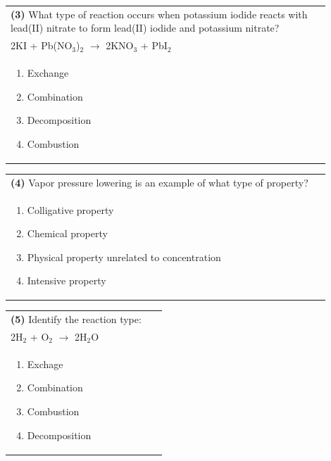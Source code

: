 \documentclass{article}
\begin{document}
\noindent\begin{tabular}{|p{0.9\linewidth}|}
\hline
\textbf{(3)} What type of reaction occurs when potassium iodide reacts with lead(II) nitrate to form lead(II) iodide and potassium nitrate?\\[0.2cm]
2KI + Pb(NO$_3$)$_2$ $\rightarrow$ 2KNO$_3$ + PbI$_2$\\[0.2cm]
\begin{minipage}[t]{0.85\linewidth}
\begin{enumerate}[label=\alph*.]
\item Exchange
\item Combination
\item Decomposition
\item Combustion
\end{enumerate}
\end{minipage}\\[0.2cm]
\hline
\end{tabular}

\noindent\begin{tabular}{|p{0.9\linewidth}|}
\hline
\textbf{(4)} Vapor pressure lowering is an example of what type of property?\\[0.2cm]
\begin{minipage}[t]{0.85\linewidth}
\begin{enumerate}[label=\alph*.]
\item Colligative property
\item Chemical property
\item Physical property unrelated to concentration
\item Intensive property
\end{enumerate}
\end{minipage}\\[0.2cm]
\hline
\end{tabular}
\newpage

\noindent\begin{tabular}{|p{0.9\linewidth}|}
\hline
\textbf{(5)} Identify the reaction type:\\[0.2cm]
2H$_2$ + O$_2$ $\rightarrow$ 2H$_2$O\\[0.2cm]
\begin{minipage}[t]{0.85\linewidth}
\begin{enumerate}[label=\alph*.]
\item Exchage
\item Combination
\item Combustion
\item Decomposition
\end{enumerate}
\end{minipage}\\[0.2cm]
\hline
\end{tabular}
\end{document}
